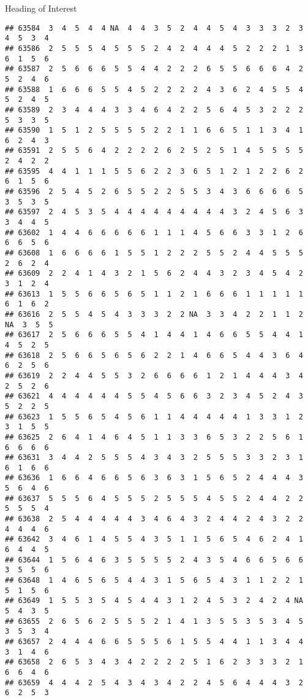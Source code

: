 \documentclass[
  ignorenonframetext,
]{beamer}
\begin{document}
\begin{frame}[fragile]{Heading of Interest}
\begin{verbatim}
## 63584  3  4  5  4  4 NA  4  4  3  5  2  4  4  5  4  3  3  3  2  3  4  5  3  4
## 63586  2  5  5  5  4  5  5  5  2  4  2  4  4  4  5  2  2  2  1  3  6  1  5  6
## 63587  2  5  6  6  6  5  5  4  4  2  2  2  6  5  5  6  6  6  4  2  5  2  4  6
## 63588  1  6  6  6  5  5  4  5  2  2  2  2  4  3  6  2  4  5  5  4  5  2  4  5
## 63589  2  3  4  4  4  3  3  4  6  4  2  2  5  6  4  5  3  2  2  2  5  3  3  5
## 63590  1  5  1  2  5  5  5  5  2  2  1  1  6  6  5  1  1  3  4  1  6  2  4  3
## 63591  2  5  5  6  4  2  2  2  2  6  2  5  2  5  1  4  5  5  5  5  2  4  2  2
## 63595  4  4  1  1  1  5  5  6  2  2  3  6  5  1  2  1  2  2  6  2  6  1  5  6
## 63596  2  5  4  5  2  6  5  5  2  2  5  5  3  4  3  6  6  6  6  5  3  5  3  5
## 63597  2  4  5  3  5  4  4  4  4  4  4  4  4  4  3  2  4  5  6  3  3  4  4  5
## 63602  1  4  4  6  6  6  6  6  1  1  1  4  5  6  6  3  3  1  2  6  6  6  5  6
## 63608  1  6  6  6  6  1  5  5  1  2  2  2  5  5  2  4  4  5  5  5  2  6  2  4
## 63609  2  2  4  1  4  3  2  1  5  6  2  4  4  3  2  3  4  5  4  2  3  1  2  4
## 63613  1  5  5  6  6  5  6  5  1  1  2  1  6  6  6  1  1  1  1  1  6  1  6  2
## 63616  2  5  5  4  5  4  3  3  3  2  2 NA  3  3  4  2  2  1  1  2 NA  3  5  5
## 63617  2  5  6  6  6  5  5  4  1  4  4  1  4  6  6  5  5  4  4  1  4  5  2  5
## 63618  2  5  6  6  5  6  5  6  2  2  1  4  6  6  5  4  4  3  6  4  6  2  5  6
## 63619  2  2  4  4  5  5  3  2  6  6  6  6  1  2  1  4  4  4  3  4  2  5  2  6
## 63621  4  4  4  4  4  4  5  5  4  5  6  6  3  2  3  4  5  2  4  3  5  2  2  5
## 63623  1  5  5  6  5  4  5  6  1  1  4  4  4  4  4  1  3  3  1  2  3  1  5  5
## 63625  2  6  4  1  4  6  4  5  1  1  3  3  6  5  3  2  2  5  6  1  6  6  6  6
## 63631  3  4  4  2  5  5  5  4  3  4  3  2  5  5  5  3  3  2  3  1  6  1  6  6
## 63636  1  6  6  4  6  6  5  6  3  6  3  1  5  6  5  2  4  4  4  3  5  6  4  6
## 63637  5  5  5  6  4  5  5  5  2  5  5  5  4  5  5  2  4  4  2  2  5  5  5  4
## 63638  2  5  4  4  4  4  4  3  4  6  4  3  2  4  4  2  4  3  2  2  4  4  4  6
## 63642  3  4  6  1  4  5  5  4  3  5  1  1  5  6  5  4  6  2  4  1  6  4  4  5
## 63644  1  5  6  4  6  3  5  5  5  5  2  4  3  5  4  6  6  5  6  6  3  5  5  6
## 63648  1  4  6  5  6  5  4  4  3  1  5  6  5  4  3  1  1  2  2  1  5  1  5  6
## 63649  1  5  5  3  5  4  5  4  4  3  1  2  4  5  3  2  4  2  4 NA  5  4  3  5
## 63655  2  6  5  6  2  5  5  5  2  1  4  1  3  5  5  3  5  3  4  5  3  5  3  4
## 63657  2  4  4  4  6  6  5  5  5  6  1  5  5  4  4  1  1  3  4  4  3  1  4  6
## 63658  2  6  5  3  4  3  4  2  2  2  2  5  1  6  2  3  3  3  2  1  6  6  4  6
## 63659  4  4  4  2  5  4  3  4  3  4  2  2  4  5  6  4  4  4  3  2  6  2  5  3

\end{verbatim}
\end{frame}
\end{document}
